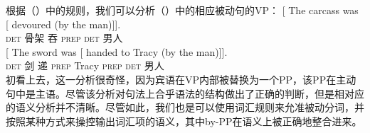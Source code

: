 根据（）中的规则，我们可以分析（）中的相应被动句的VP：
\eal
\ex
\gll {} [ The carcass was [ devoured (by the man)]].\\
{} {} \textsc{det} 骨架 \passivepst{} {} 吞 \textsc{prep} \textsc{det} 男人\\
\ex
\gll {} [ The sword was [ handed to Tracy (by the man)]].\\
{} {} \textsc{det} 剑 \passivepst{} {} 递 \textsc{prep} Tracy \textsc{prep} \textsc{det} 男人\\
\zl
%
初看上去，这一分析很奇怪，因为宾语在VP内部被替换为一个PP，该PP在主动句中是主语。尽管该分析对句法上合乎语法的结构做出了正确的判断，但是相对应的语义分析并不清晰。尽管如此，我们也是可以使用词汇规则来允准被动分词，并按照某种方式来操控输出词汇项的语义，其中by-PP在语义上被正确地整合进来\citep[]{GKPS85a}。

